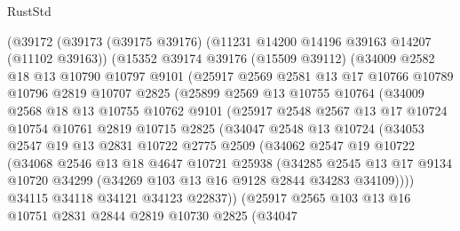 \begin{lexlean}{RustStd}
\begin{coremodule}
    (@39172
      (@39173
        (@39175 @39176)
        (@11231 @14200 @14196 @39163 @14207 (@11102 @39163))
        (@15352
          @39174
          @39176
          (@15509 @39112)
          (@34009
            @2582
            @18
            @13
            @10790
            @10797
            @9101
            (@25917
              @2569
              @2581
              @13
              @17
              @10766
              @10789
              @10796
              @2819
              @10707
              @2825
              (@25899
                @2569
                @13
                @10755
                @10764
                (@34009
                  @2568
                  @18
                  @13
                  @10755
                  @10762
                  @9101
                  (@25917
                    @2548
                    @2567
                    @13
                    @17
                    @10724
                    @10754
                    @10761
                    @2819
                    @10715
                    @2825
                    (@34047
                      @2548
                      @13
                      @10724
                      (@34053
                        @2547
                        @19
                        @13
                        @2831
                        @10722
                        @2775
                        @2509
                        (@34062
                          @2547
                          @19
                          @10722
                          (@34068
                            @2546
                            @13
                            @18
                            @4647
                            @10721
                            @25938
                            (@34285
                              @2545
                              @13
                              @17
                              @9134
                              @10720
                              @34299
                              (@34269 @103 @13 @16 @9128 @2844 @34283 @34109))))
                        @34115
                        @34118
                        @34121
                        @34123
                        @22837))
                    (@25917
                      @2565
                      @103
                      @13
                      @16
                      @10751
                      @2831
                      @2844
                      @2819
                      @10730
                      @2825
                      (@34047

\end{coremodule}
\end{lexlean}
